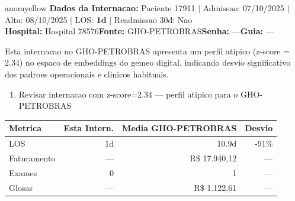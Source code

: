 \documentclass[a4paper,10pt]{article}
\begin{document}
\begin{anomalycard}[Internacao 150213 | GHO-PETROBRAS | MODERADO (z=2.34)]{anomyellow}
\textbf{Dados da Internacao:} Paciente 17911 $\mid$ Admissao: 07/10/2025 $\mid$ Alta: 08/10/2025 $\mid$ LOS: \textbf{1d} $\mid$ Readmissao 30d: Nao\\
\textbf{Hospital:} Hospital 78576\quad\textbf{Fonte:} GHO-PETROBRAS\quad\textbf{Senha:} ---\quad\textbf{Guia:} ---\\
\vspace{2pt}\begin{tcolorbox}[colback=severityred!20,colframe=anomyellow,title={\textbf{Interpretacao de Negocio}},fonttitle=\bfseries\small,left=4pt,right=4pt,top=3pt,bottom=3pt]
{\small Esta internacao no GHO-PETROBRAS apresenta um perfil atipico (z-score = 2.34) no espaco de embeddings do gemeo digital, indicando desvio significativo dos padroes operacionais e clinicos habituais.}
\end{tcolorbox}
\begin{tcolorbox}[colback=severityyellow!30,colframe=anomorange,title={\textbf{Recomendacoes Especificas}},fonttitle=\bfseries\small,left=4pt,right=4pt,top=3pt,bottom=3pt]
\begin{enumerate}[nosep,leftmargin=16pt]
\item {\small Revisar internacao com z-score=2.34 --- perfil atipico para o GHO-PETROBRAS}
\end{enumerate}
\end{tcolorbox}
\begin{center}\begin{tabular}{l r r r}\toprule\textbf{Metrica} & \textbf{Esta Intern.} & \textbf{Media GHO-PETROBRAS} & \textbf{Desvio} \\\midrule
LOS & 1d & 10.9d & -91\% \\
Faturamento & --- & R\$ 17.940,12 & --- \\
Exames & 0 & 1 & --- \\
Glosas & --- & R\$ 1.122,61 & --- \\
\bottomrule\end{tabular}\end{center}


\end{anomalycard}
\end{document}
